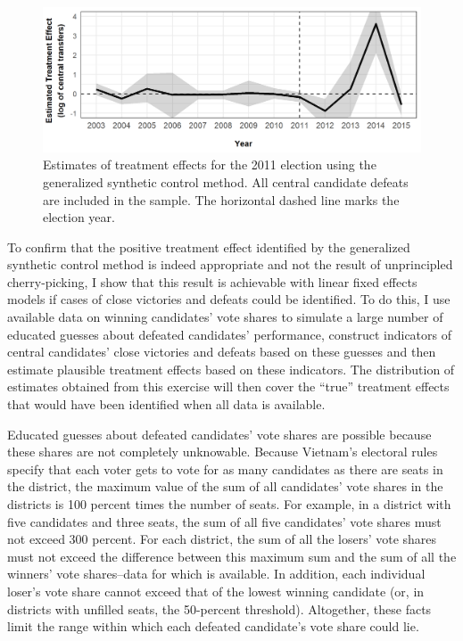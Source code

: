 \documentclass[12pt]{article}
\newcommand{\1}{\mathbbm{1}}
\begin{document}
\begin{figure}[!h]
	\centering
	\includegraphics[]{figure/210202_synth_results_2011.png}
	\captionsetup{singlelinecheck=off}
	\caption[Estimated synthetic control treatment effects for 2011]{Estimates of treatment effects for the 2011 election using the generalized synthetic control method. All central candidate defeats are included in the sample. The horizontal dashed line marks the election year.}
	\label{fig:synth_results_2011}
\end{figure}

To confirm that the positive treatment effect identified by the generalized synthetic control method \citep{Xu2017gsynth} is indeed appropriate and not the result of unprincipled cherry-picking, I show that this result is achievable with linear fixed effects models if cases of close victories and defeats could be identified. To do this, I use available data on winning candidates' vote shares to simulate a large number of educated guesses about defeated candidates' performance, construct indicators of central candidates' close victories and defeats based on these guesses and then estimate plausible treatment effects based on these indicators. The distribution of estimates obtained from this exercise will then cover the ``true'' treatment effects that would have been identified when all data is available.

Educated guesses about defeated candidates' vote shares are possible because these shares are not completely unknowable. Because Vietnam's electoral rules specify that each voter gets to vote for as many candidates as there are seats in the district, the maximum value of the sum of all candidates' vote shares in the districts is 100 percent times the number of seats. For example, in a district with five candidates and three seats, the sum of all five candidates' vote shares must not exceed 300 percent. For each district, the sum of all the losers' vote shares must not exceed the difference between this maximum sum and the sum of all the winners' vote shares--data for which is available. In addition, each individual loser's vote share cannot exceed that of the lowest winning candidate (or, in districts with unfilled seats, the 50-percent threshold). Altogether, these facts limit the range within which each defeated candidate's vote share could lie.
\end{document}
